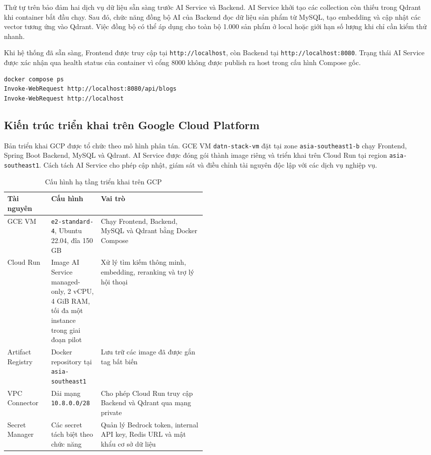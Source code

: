 Thứ tự trên bảo đảm hai dịch vụ dữ liệu sẵn sàng trước AI Service và Backend. AI Service khởi tạo các collection còn thiếu trong Qdrant khi container bắt đầu chạy. Sau đó, chức năng đồng bộ AI của Backend đọc dữ liệu sản phẩm từ MySQL, tạo embedding và cập nhật các vector tương ứng vào Qdrant. Việc đồng bộ có thể áp dụng cho toàn bộ 1.000 sản phẩm ở local hoặc giới hạn số lượng khi chỉ cần kiểm thử nhanh.

Khi hệ thống đã sẵn sàng, Frontend được truy cập tại \texttt{http://localhost}, còn Backend tại \texttt{http://localhost:8080}. Trạng thái AI Service được xác nhận qua health status của container vì cổng 8000 không được publish ra host trong cấu hình Compose gốc.

\begin{lstlisting}[style=terminal,caption={Kiểm tra hệ thống chạy local},label={lst:local-compose-check}]
docker compose ps
Invoke-WebRequest http://localhost:8080/api/blogs
Invoke-WebRequest http://localhost
\end{lstlisting}

\subsection{Kiến trúc triển khai trên Google Cloud Platform}

Bản triển khai GCP được tổ chức theo mô hình phân tán. GCE VM \texttt{datn-stack-vm} đặt tại zone \texttt{asia-southeast1-b} chạy Frontend, Spring Boot Backend, MySQL và Qdrant. AI Service được đóng gói thành image riêng và triển khai trên Cloud Run tại region \texttt{asia-southeast1}. Cách tách AI Service cho phép cập nhật, giám sát và điều chỉnh tài nguyên độc lập với các dịch vụ nghiệp vụ.

\begin{table}[H]
\centering
\caption{Cấu hình hạ tầng triển khai trên GCP}
\label{tab:gcp-resource-config}
\begin{tabularx}{\linewidth}{|p{0.22\linewidth}|p{0.25\linewidth}|X|}
\hline
\textbf{Tài nguyên} & \textbf{Cấu hình} & \textbf{Vai trò} \\ \hline
GCE VM & \texttt{e2-standard-4}, Ubuntu 22.04, đĩa 150 GB & Chạy Frontend, Backend, MySQL và Qdrant bằng Docker Compose \\ \hline
Cloud Run & Image AI Service managed-only, 2 vCPU, 4 GiB RAM, tối đa một instance trong giai đoạn pilot & Xử lý tìm kiếm thông minh, embedding, reranking và trợ lý hội thoại \\ \hline
Artifact Registry & Docker repository tại \texttt{asia-southeast1} & Lưu trữ các image đã được gắn tag bất biến \\ \hline
VPC Connector & Dải mạng \texttt{10.8.0.0/28} & Cho phép Cloud Run truy cập Backend và Qdrant qua mạng private \\ \hline
Secret Manager & Các secret tách biệt theo chức năng & Quản lý Bedrock token, internal API key, Redis URL và mật khẩu cơ sở dữ liệu \\ \hline
\end{tabularx}
\end{table}

